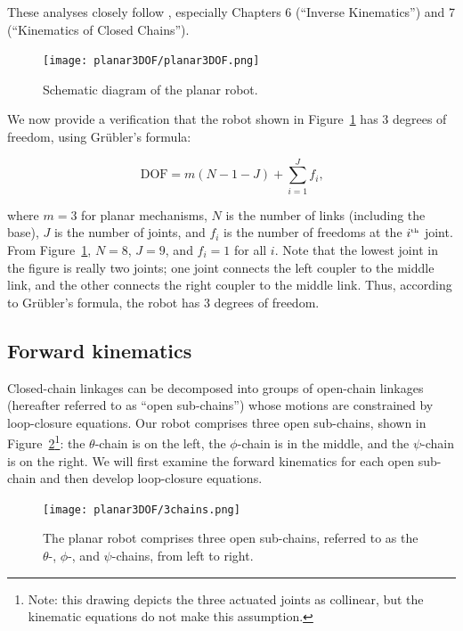 \documentclass{report}
\begin{document}
These analyses closely follow \cite{MR}, especially Chapters 6 (``Inverse Kinematics'') and 7 (``Kinematics of Closed Chains'').

\begin{figure}[h!]
	\centering
	\texttt{[image: planar3DOF/planar3DOF.png]}
	\caption{Schematic diagram of the planar robot.}
	\label{fig:robotSchematic}
\end{figure}

We now provide a verification that the robot shown in Figure~\ref{fig:robotSchematic} has 3 degrees of freedom, using Gr\"{u}bler's formula:

\begin{equation}
\textrm{DOF} = m(N-1-J) + \sum_{i=1}^{J} f_i \text{,}
\end{equation}

where $m = 3$ for planar mechanisms, $N$ is the number of links (including the base), $J$ is the number of joints, and $f_i$ is the number of freedoms at the $i^{\text{\tiny th}}$ joint. From Figure~\ref{fig:robotSchematic}, $N = 8$, $J = 9$, and $f_i = 1$ for all $i$. Note that the lowest joint in the figure is really two joints; one joint connects the left coupler to the middle link, and the other connects the right coupler to the middle link. Thus, according to Gr\"{u}bler's formula, the robot has 3 degrees of freedom.

\subsection[Forward kinematics]{Forward kinematics}
Closed-chain linkages can be decomposed into groups of open-chain linkages (hereafter referred to as ``open sub-chains'') whose motions are constrained by loop-closure equations. Our robot comprises three open sub-chains, shown in Figure~\ref{fig:3chains}\footnote{Note: this drawing depicts the three actuated joints as collinear, but the kinematic equations do not make this assumption.}: the $\theta$-chain is on the left, the $\phi$-chain is in the middle, and the $\psi$-chain is on the right. We will first examine the forward kinematics for each open sub-chain and then develop loop-closure equations.

\begin{figure}[h!]
	\centering
	\texttt{[image: planar3DOF/3chains.png]}
	\caption{The planar robot comprises three open sub-chains, referred to as the $\theta$-, $\phi$-, and $\psi$-chains, from left to right.}
	\label{fig:3chains}
\end{figure}
\end{document}
